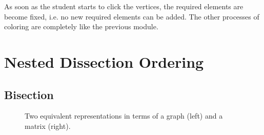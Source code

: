 \documentclass[12pt, twoside]{book}
\begin{document}
As soon as the student starts to click the vertices, the required elements
are become fixed, i.e. no new required elements can be added.
The other processes of coloring are completely like the previous module.

\section{Nested Dissection Ordering}
\subsection{Bisection}
\cite{2014:02}
\begin{figure}
\centering
{}%
\caption{Two equivalent representations in terms of a graph (left) and a matrix (right).}
\label{initial}
\end{figure}
\end{document}
